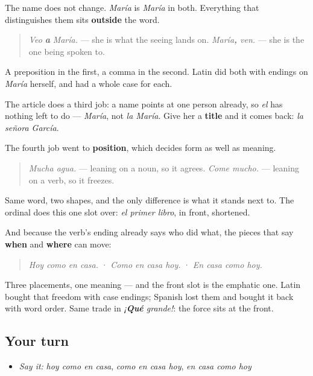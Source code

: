 \begin{grammarlens}[title={What you've built}]
The name does not change. \emph{María} is \emph{María} in both. Everything that distinguishes them sits \textbf{outside} the word.

\begin{quote}
\emph{Veo} \emph{\textbf{a}} \emph{María.} — she is what the seeing lands on. \emph{María\emph{\textbf{\emph{,}} }ven.} — she is the one being spoken to.
\end{quote}

A preposition in the first, a comma in the second. Latin did both with endings on \emph{María} herself, and had a whole case for each.

The article does a third job: a name points at one person already, so \emph{el} has nothing left to do — \emph{María}, not \emph{la María}. Give her a \textbf{title} and it comes back: \emph{la señora García}.
\end{grammarlens}

\begin{culture}
The fourth job went to \textbf{position}, which decides form as well as meaning.

\begin{quote}
\emph{Mucha agua.} — leaning on a noun, so it agrees. \emph{Come mucho.} — leaning on a verb, so it freezes.
\end{quote}

Same word, two shapes, and the only difference is what it stands next to. The ordinal does this one slot over: \emph{el primer libro}, in front, shortened.

And because the verb's ending already says who did what, the pieces that say \textbf{when} and \textbf{where} can move:

\begin{quote}
\emph{Hoy como en casa.}  ·  \emph{Como en casa hoy.}  ·  \emph{En casa como hoy.}
\end{quote}

Three placements, one meaning — and the front slot is the emphatic one. Latin bought that freedom with case endings; Spanish lost them and bought it back with word order. Same trade in \emph{¡\textbf{Qué} grande!}: the force sits at the front.
\end{culture}

\subsection*{Your turn}
\begin{itemize}
\raggedright
  \item \emph{Say it:} \emph{hoy como en casa}, \emph{como en casa hoy}, \emph{en casa como hoy}
\end{itemize}

